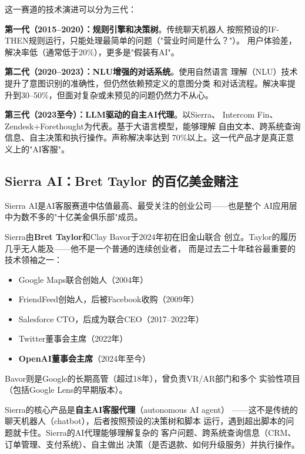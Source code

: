 这一赛道的技术演进可以分为三代：

\textbf{第一代（2015--2020）：规则引擎和决策树}。传统聊天机器人
按照预设的IF-THEN规则运行，只能处理最简单的问题（"营业时间是什么？"）。
用户体验差，解决率低（通常低于20\%），更多是"假装有AI"。

\textbf{第二代（2020--2023）：NLU增强的对话系统}。使用自然语言
理解（NLU）技术提升了意图识别的准确性，但仍然依赖预定义的意图分类
和对话流程。解决率提升到30--50\%，但面对复杂或未预见的问题仍然力不从心。

\textbf{第三代（2023至今）：LLM驱动的自主AI代理}。以Sierra、
Intercom Fin、Zendesk+Forethought为代表。基于大语言模型，能够理解
自由文本、跨系统查询信息、自主决策和执行操作。声称解决率达到
70\%以上。这一代产品才是真正意义上的"AI客服"。

\subsection{Sierra AI：Bret Taylor 的百亿美金赌注}
\label{subsec:sierra}

Sierra AI是AI客服赛道中估值最高、最受关注的创业公司——也是整个
AI应用层中为数不多的"十亿美金俱乐部"成员。

Sierra由\textbf{Bret Taylor}和Clay Bavor于2024年初在旧金山联合
创立。Taylor的履历几乎无人能及——他不是一个普通的连续创业者，
而是过去二十年硅谷最重要的技术领袖之一：

\begin{itemize}
  \item Google Maps联合创始人（2004年）
  \item FriendFeed创始人，后被Facebook收购（2009年）
  \item Salesforce CTO，后成为联合CEO（2017--2022年）
  \item Twitter董事会主席（2022年）
  \item \textbf{OpenAI董事会主席}（2024年至今）
\end{itemize}

Bavor则是Google的长期高管（超过18年），曾负责VR/AR部门和多个
实验性项目（包括Google Lens的早期版本）。

Sierra的核心产品是\textbf{自主AI客服代理}（autonomous AI agent）
——这不是传统的聊天机器人（chatbot），后者按照预设的决策树和脚本
运行，遇到超出脚本的问题就卡住。Sierra的AI代理能够理解复杂的
客户问题、跨系统查询信息（CRM、订单管理、支付系统）、自主做出
决策（是否退款、如何升级服务）并执行操作。

